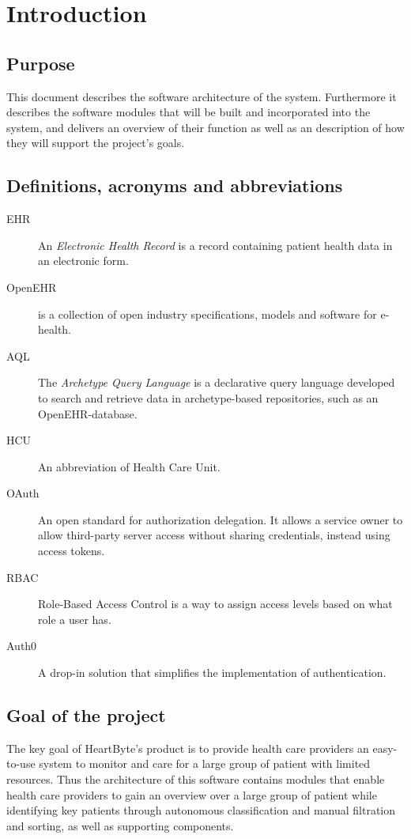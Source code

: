 \documentclass{article}
\begin{document}
\clearpage

\tableofcontents
\clearpage

\section{Introduction}
\subsection{Purpose}
This document describes the software architecture of the system. Furthermore it describes the software modules that will be built and incorporated into the system, and delivers an overview of their function as well as an description of how they will support the project's goals.

\subsection{Definitions, acronyms and abbreviations}
\begin{description}
\item [EHR] An \emph{Electronic Health Record} is a record containing patient health data in an electronic form.
\item [OpenEHR] is a collection of open industry specifications, models and software for e-health.
\item [AQL] The \emph{Archetype Query Language} is a declarative query language developed to search and retrieve data in archetype-based repositories, such as an OpenEHR-database.
\item [HCU] An abbreviation of Health Care Unit.
\item [OAuth] An open standard for authorization delegation. It allows a service owner to allow third-party server access without sharing credentials, instead using access tokens. 
\item [RBAC] Role-Based Access Control is a way to assign access levels based on what role a user has.
\item [Auth0] A drop-in solution that simplifies the implementation of authentication.
\end{description}

\subsection{Goal of the project}
The key goal of HeartByte's product is to provide health care providers an easy-to-use system to monitor and care for a large group of patient with limited resources. Thus the architecture of this software contains modules that enable health care providers to gain an overview over a large group of patient while identifying key patients through autonomous classification and manual filtration and sorting, as well as supporting components.
\end{document}

